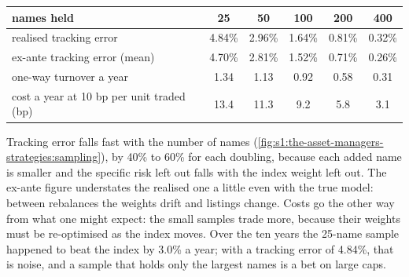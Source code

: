 \begin{center}
\small
\begin{tabular}{@{}lccccc@{}}
\toprule
names held & 25 & 50 & 100 & 200 & 400\\
\midrule
realised tracking error & 4.84\% & 2.96\% & 1.64\% & 0.81\% & 0.32\%\\
ex-ante tracking error (mean) & 4.70\% & 2.81\% & 1.52\% & 0.71\% & 0.26\%\\
one-way turnover a year & 1.34 & 1.13 & 0.92 & 0.58 & 0.31\\
cost a year at 10 bp per unit traded (bp) & 13.4 & 11.3 & 9.2 & 5.8 & 3.1\\
\bottomrule
\end{tabular}
\end{center}

Tracking error falls fast with the number of names (\cref{fig:s1:the-asset-managers-strategies:sampling}), by 40\% to 60\% for each doubling, because
each added name is smaller and the specific risk left out falls with the index weight left out. The ex-ante figure understates the realised one a little
even with the true model: between rebalances the weights drift and listings change. Costs go the other way from what one might expect: the small samples
trade more, because their weights must be re-optimised as the index moves. Over the ten years the 25-name sample happened to beat the index by 3.0\% a
year; with a tracking error of 4.84\%, that is noise, and a sample that holds only the largest names is a bet on large caps.

\begin{omfigure}

\label{fig:s1:the-asset-managers-strategies:sampling}
\end{omfigure}

